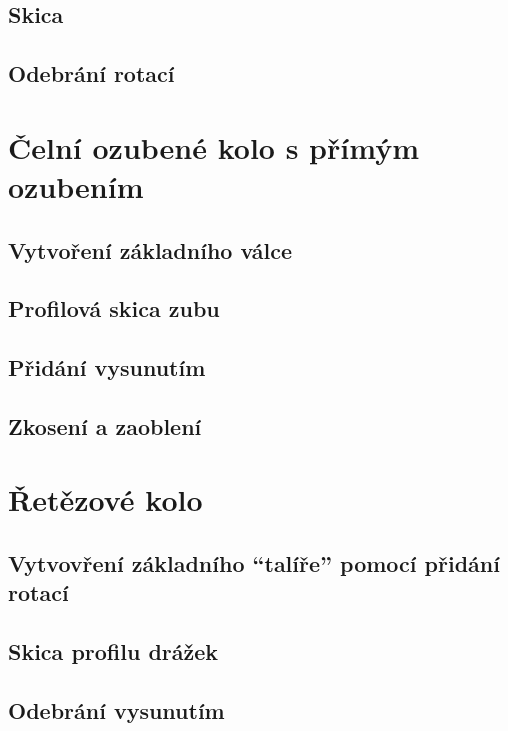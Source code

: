 \subsection*{Skica}

\subsection*{Odebrání rotací}

\section{Čelní ozubené kolo s přímým ozubením}

\subsection*{Vytvoření základního válce}

\subsection*{Profilová skica zubu}

\subsection*{Přidání vysunutím}

\subsection*{Zkosení a zaoblení}

\section{Řetězové kolo}

\subsection*{Vytvovření základního \enquote{talíře} pomocí přidání rotací}

\subsection*{Skica profilu drážek}

\subsection*{Odebrání vysunutím}

